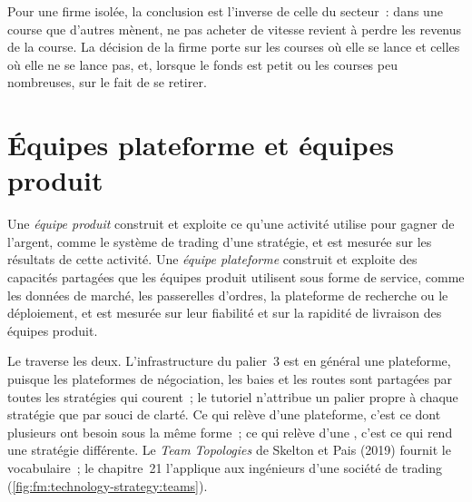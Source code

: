 Pour une firme isolée, la conclusion est l'inverse de celle du secteur~: dans une course que d'autres mènent, ne pas acheter de vitesse revient à perdre les revenus de la course.
La décision de la firme porte sur les courses où elle se lance et celles où elle ne se lance pas, et, lorsque le fonds est petit ou les courses peu nombreuses, sur le fait de se retirer.

\section{Équipes plateforme et équipes produit}

\begin{definition}\label{def:fm:technology-strategy:teams}
Une \emph{équipe produit} construit et exploite ce qu'une activité utilise pour gagner de l'argent, comme le système de trading d'une stratégie, et est
mesurée sur les résultats de cette activité. Une \emph{équipe plateforme} construit et exploite des capacités partagées que les équipes produit utilisent
sous forme de service, comme les données de marché, les passerelles d'ordres, la plateforme de recherche ou le déploiement, et est mesurée sur leur fiabilité et sur la
rapidité de livraison des équipes produit.
\end{definition}

Le  traverse les deux. L'infrastructure du palier~3 est en général une plateforme, puisque les plateformes de négociation, les baies et les routes sont partagées par toutes les stratégies
qui courent~; le tutoriel n'attribue un palier propre à chaque stratégie que par souci de clarté. Ce qui relève d'une plateforme, c'est ce dont plusieurs  ont besoin
sous la même forme~; ce qui relève d'une , c'est ce qui rend une stratégie différente. Le \emph{Team Topologies} de Skelton et Pais (2019) fournit le
vocabulaire~; le chapitre~21 l'applique aux ingénieurs d'une société de trading (\cref{fig:fm:technology-strategy:teams}).

